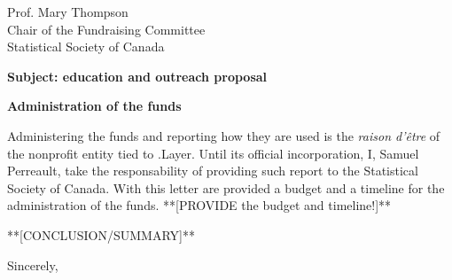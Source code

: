 \documentclass[11pt, a4paper]{letter} %
\begin{document}
\begin{letter}{
	Prof. Mary Thompson\\
	Chair of the Fundraising Committee\\
	Statistical Society of Canada
	
	\bigskip
	\textbf{Subject: education and outreach proposal}%
}
\bigskip
\noindent \textbf{Administration of the funds}

Administering the funds and reporting how they are used is the \emph{raison d'\^{e}tre} of the nonprofit entity tied to .Layer. Until its official incorporation, I, Samuel Perreault, take the responsability of providing such report to the Statistical Society of Canada. With this letter are provided a budget and a timeline for the administration of the funds. **[PROVIDE the budget and timeline!]**

\bigskip

**[CONCLUSION/SUMMARY]**

%
      
\closing{Sincerely,}




\end{letter}
\end{document}
